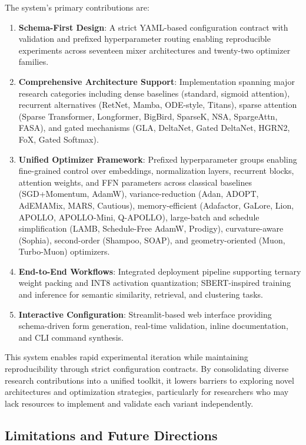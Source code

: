\documentclass[11pt,a4paper]{article}
\begin{document}
The system's primary contributions are:
\begin{enumerate}[leftmargin=*]
    \item \textbf{Schema-First Design}: A strict YAML-based configuration contract with validation and prefixed hyperparameter routing enabling reproducible experiments across seventeen mixer architectures and twenty-two optimizer families.
    \item \textbf{Comprehensive Architecture Support}: Implementation spanning major research categories including dense baselines (standard, sigmoid attention), recurrent alternatives (RetNet, Mamba, ODE-style, Titans), sparse attention (Sparse Transformer, Longformer, BigBird, SparseK, NSA, SpargeAttn, FASA), and gated mechanisms (GLA, DeltaNet, Gated DeltaNet, HGRN2, FoX, Gated Softmax).
    \item \textbf{Unified Optimizer Framework}: Prefixed hyperparameter groups enabling fine-grained control over embeddings, normalization layers, recurrent blocks, attention weights, and FFN parameters across classical baselines (SGD+Momentum, AdamW), variance-reduction (Adan, ADOPT, AdEMAMix, MARS, Cautious), memory-efficient (Adafactor, GaLore, Lion, APOLLO, APOLLO-Mini, Q-APOLLO), large-batch and schedule simplification (LAMB, Schedule-Free AdamW, Prodigy), curvature-aware (Sophia), second-order (Shampoo, SOAP), and geometry-oriented (Muon, Turbo-Muon) optimizers.
    \item \textbf{End-to-End Workflows}: Integrated deployment pipeline supporting ternary weight packing and INT8 activation quantization; SBERT-inspired training and inference for semantic similarity, retrieval, and clustering tasks.
    \item \textbf{Interactive Configuration}: Streamlit-based web interface providing schema-driven form generation, real-time validation, inline documentation, and CLI command synthesis.
\end{enumerate}

This system enables rapid experimental iteration while maintaining reproducibility through strict configuration contracts. By consolidating diverse research contributions into a unified toolkit, it lowers barriers to exploring novel architectures and optimization strategies, particularly for researchers who may lack resources to implement and validate each variant independently.

\subsection{Limitations and Future Directions}
\end{document}
